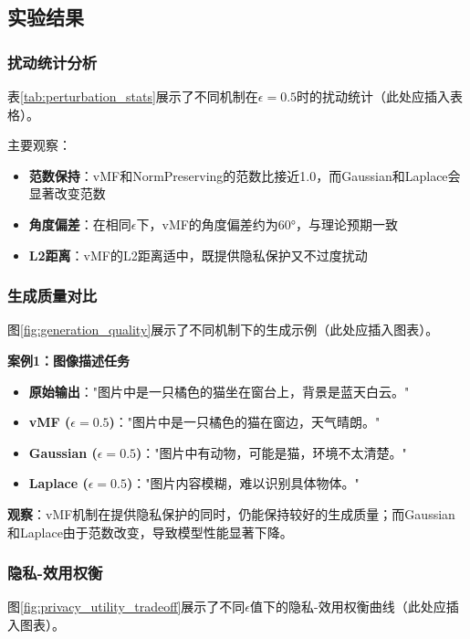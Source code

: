 \documentclass[a4paper,12pt]{article}
\begin{document}
\subsection{实验结果}

\subsubsection{扰动统计分析}

表\ref{tab:perturbation_stats}展示了不同机制在$\epsilon=0.5$时的扰动统计（此处应插入表格）。

主要观察：
\begin{itemize}
  \item \textbf{范数保持}：vMF和NormPreserving的范数比接近1.0，而Gaussian和Laplace会显著改变范数
  \item \textbf{角度偏差}：在相同$\epsilon$下，vMF的角度偏差约为60°，与理论预期一致
  \item \textbf{L2距离}：vMF的L2距离适中，既提供隐私保护又不过度扰动
\end{itemize}

\subsubsection{生成质量对比}

图\ref{fig:generation_quality}展示了不同机制下的生成示例（此处应插入图表）。

\textbf{案例1：图像描述任务}
\begin{itemize}
  \item \textbf{原始输出}："图片中是一只橘色的猫坐在窗台上，背景是蓝天白云。"
  \item \textbf{vMF ($\epsilon=0.5$)}："图片中是一只橘色的猫在窗边，天气晴朗。"
  \item \textbf{Gaussian ($\epsilon=0.5$)}："图片中有动物，可能是猫，环境不太清楚。"
  \item \textbf{Laplace ($\epsilon=0.5$)}："图片内容模糊，难以识别具体物体。"
\end{itemize}

\textbf{观察}：vMF机制在提供隐私保护的同时，仍能保持较好的生成质量；而Gaussian和Laplace由于范数改变，导致模型性能显著下降。

\subsubsection{隐私-效用权衡}

图\ref{fig:privacy_utility_tradeoff}展示了不同$\epsilon$值下的隐私-效用权衡曲线（此处应插入图表）。
\end{document}
